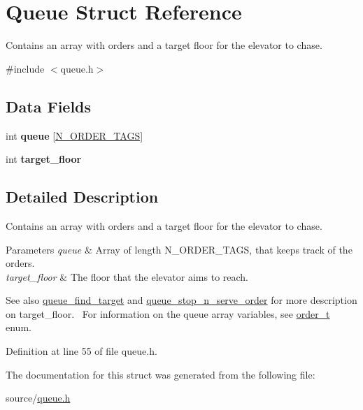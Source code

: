 \hypertarget{structQueue}{}\section{Queue Struct Reference}
\label{structQueue}


Contains an array with orders and a target floor for the elevator to chase.  




{\ttfamily \#include $<$queue.\+h$>$}

\subsection*{Data Fields}
\begin{DoxyCompactItemize}
\item 
\mbox{\label{structQueue_a5009d22561b0a1f0b94883331e98337f}} 
int {\bfseries queue} \mbox{[}\mbox{\hyperlink{queue_8h_a6c7dd10fb53eaa1cb9705e4ee36f5fcba468de5038698a54ae672a7879f92bc05}{N\+\_\+\+O\+R\+D\+E\+R\+\_\+\+T\+A\+GS}}\mbox{]}
\item 
\mbox{\label{structQueue_a95698e7080ed2265155b7bad70e7cdd7}} 
int {\bfseries target\+\_\+floor}
\end{DoxyCompactItemize}


\subsection{Detailed Description}
Contains an array with orders and a target floor for the elevator to chase. 


\begin{DoxyParams}{Parameters}
{\em queue} & Array of length N\+\_\+\+O\+R\+D\+E\+R\+\_\+\+T\+A\+GS, that keeps track of the orders. \\
\hline
{\em target\+\_\+floor} & The floor that the elevator aims to reach.\\
\hline
\end{DoxyParams}
\begin{DoxySeeAlso}{See also}
\mbox{\hyperlink{queue_8h_ae1f1f6105b668e5722bd779a25a2439d}{queue\+\_\+find\+\_\+target}} and \mbox{\hyperlink{queue_8h_a6246a25fc3b07b678c031c3dd798e077}{queue\+\_\+stop\+\_\+n\+\_\+serve\+\_\+order}} for more description on {\ttfamily target\+\_\+floor}.~\newline
For information on the {\ttfamily queue} array variables, see \mbox{\hyperlink{queue_8h_a6c7dd10fb53eaa1cb9705e4ee36f5fcb}{order\+\_\+t}} enum. 
\end{DoxySeeAlso}


Definition at line 55 of file queue.\+h.



The documentation for this struct was generated from the following file\+:\begin{DoxyCompactItemize}
\item 
source/\mbox{\hyperlink{queue_8h}{queue.\+h}}\end{DoxyCompactItemize}
